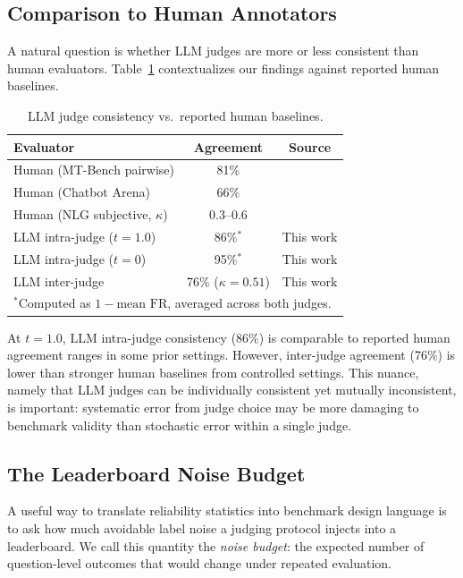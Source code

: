 \documentclass{ijclclp}
\begin{document}
\subsection{Comparison to Human Annotators}

A natural question is whether LLM judges are more or less consistent than human evaluators. Table~\ref{tab:human} contextualizes our findings against reported human baselines.

\begin{table}[h]
\centering
\caption{LLM judge consistency vs.\ reported human baselines.}
\label{tab:human}
\begin{tabular}{lcc}
\toprule
\textbf{Evaluator} & \textbf{Agreement} & \textbf{Source} \\
\midrule
Human (MT-Bench pairwise) & 81\% & \citet{zheng2023judging} \\
Human (Chatbot Arena) & 66\% & \citet{chiang2024chatbot} \\
Human (NLG subjective, $\kappa$) & 0.3--0.6 & \citet{amidei2019agreement} \\
\midrule
LLM intra-judge ($t=1.0$) & 86\%$^*$ & This work \\
LLM intra-judge ($t=0$) & 95\%$^*$ & This work \\
LLM inter-judge & 76\% ($\kappa=0.51$) & This work \\
\bottomrule
\multicolumn{3}{l}{\small $^*$Computed as $1 - \text{mean FR}$, averaged across both judges.}
\end{tabular}
\end{table}

At $t=1.0$, LLM intra-judge consistency (86\%) is comparable to reported human agreement ranges in some prior settings. However, inter-judge agreement (76\%) is lower than stronger human baselines from controlled settings. This nuance, namely that LLM judges can be individually consistent yet mutually inconsistent, is important: systematic error from judge choice may be more damaging to benchmark validity than stochastic error within a single judge.

\subsection{The Leaderboard Noise Budget}

A useful way to translate reliability statistics into benchmark design language is to ask how much avoidable label noise a judging protocol injects into a leaderboard. We call this quantity the \emph{noise budget}: the expected number of question-level outcomes that would change under repeated evaluation.
\end{document}
